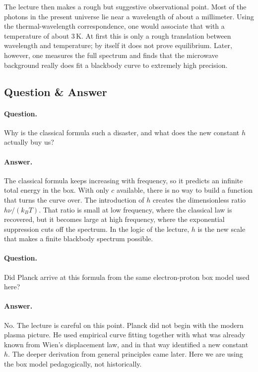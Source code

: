 The lecture then makes a rough but suggestive observational point. Most of the photons in the present universe lie near a wavelength of about a millimeter. Using the thermal-wavelength correspondence, one would associate that with a temperature of about \(3\,\mathrm{K}\). At first this is only a rough translation between wavelength and temperature; by itself it does not prove equilibrium. Later, however, one measures the full spectrum and finds that the microwave background really does fit a blackbody curve to extremely high precision.

\subsection{Question \& Answer}

\paragraph{Question.} Why is the classical formula such a disaster, and what does the new constant \(h\) actually buy us?

\paragraph{Answer.} The classical formula keeps increasing with frequency, so it predicts an infinite total energy in the box. With only \(c\) available, there is no way to build a function that turns the curve over. The introduction of \(h\) creates the dimensionless ratio \(h\nu/(k_B T)\). That ratio is small at low frequency, where the classical law is recovered, but it becomes large at high frequency, where the exponential suppression cuts off the spectrum. In the logic of the lecture, \(h\) is the new scale that makes a finite blackbody spectrum possible.

\paragraph{Question.} Did Planck arrive at this formula from the same electron-proton box model used here?

\paragraph{Answer.} No. The lecture is careful on this point. Planck did not begin with the modern plasma picture. He used empirical curve fitting together with what was already known from Wien's displacement law, and in that way identified a new constant \(h\). The deeper derivation from general principles came later. Here we are using the box model pedagogically, not historically.

